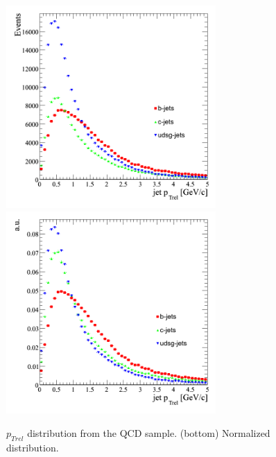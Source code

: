 \begin{figure}[htbp]
  \begin{center}
    \includegraphics[width=80mm]{Figures/jet_ptrel_allqcd.png}
    \includegraphics[width=80mm]{Figures/jet_ptrel_norm_allqcd.png}
  \end{center}
  \caption{$p_{Trel}$ distribution from the QCD sample. (bottom) Normalized distribution.}
  \label{fig:jet_ptrel_all_qcd}
\end{figure}


